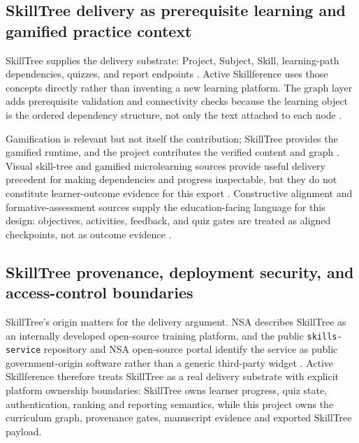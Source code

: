 \documentclass[
  english,
]{article}
\begin{document}
\subsection{SkillTree delivery as prerequisite learning and gamified
practice
context}\label{skilltree-delivery-as-prerequisite-learning-and-gamified-practice-context}

SkillTree supplies the delivery substrate: Project, Subject, Skill,
learning-path dependencies, quizzes, and report endpoints
\citep{skilltree2020nsa, skilltree2026docs, skilltree2026github}. Active
Skillference uses those concepts directly rather than inventing a new
learning platform. The graph layer adds prerequisite validation and
connectivity checks because the learning object is the ordered
dependency structure, not only the text attached to each node
\citep{bloom1956taxonomy, bloom1968learning_for_mastery, liang2018prerequisite, doignon1985knowledge_spaces, falmagne2011learning_spaces}.

Gamification is relevant but not itself the contribution; SkillTree
provides the gamified runtime, and the project contributes the verified
content and graph \citep{dicheva2015gamification}. Visual skill-tree and
gamified microlearning sources provide useful delivery precedent for
making dependencies and progress inspectable, but they do not constitute
learner-outcome evidence for this export
\citep{burau2022deciduous, septiani2021gamified_microlearning}.
Constructive alignment and formative-assessment sources supply the
education-facing language for this design: objectives, activities,
feedback, and quiz gates are treated as aligned checkpoints, not as
outcome evidence
\citep{biggs1996constructive_alignment, bloom1968learning_for_mastery, black1998assessment, shute2008formative_feedback}.

\subsection{SkillTree provenance, deployment security, and
access-control
boundaries}\label{skilltree-provenance-deployment-security-and-access-control-boundaries}

SkillTree's origin matters for the delivery argument. NSA describes
SkillTree as an internally developed open-source training platform, and
the public \texttt{skills-service} repository and NSA open-source portal
identify the service as public government-origin software rather than a
generic third-party widget
\citep{skilltree2020nsa, skilltree2026github, nsa2026opensource}. Active
Skillference therefore treats SkillTree as a real delivery substrate
with explicit platform ownership boundaries: SkillTree owns learner
progress, quiz state, authentication, ranking and reporting semantics,
while this project owns the curriculum graph, provenance gates,
manuscript evidence and exported SkillTree payload.
\end{document}

